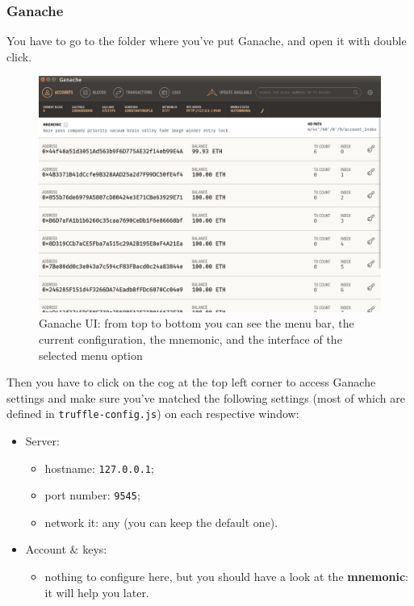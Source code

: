 \subsubsection{Ganache}
You have to go to the folder where you've put Ganache, and open it with double click.
\begin{figure}
	\centering
	\caption{Ganache UI: from top to bottom you can see the menu bar, the current configuration, the mnemonic, and the interface of the selected menu option}
	\includegraphics[scale=0.25]{res/images/ganache-ui.png}
\end{figure}
Then you have to click on the cog at the top left corner to access Ganache settings and make sure you've matched the following settings (most of which are defined in \texttt{truffle-config.js}) on each respective window:
\begin{itemize}
	\item Server:
	\begin{itemize}
		\item hostname: \texttt{127.0.0.1};
		\item port number: \texttt{9545};
		\item network it: any (you can keep the default one).
	\end{itemize}
	\item Account \& keys:
	\begin{itemize}
		\item nothing to configure here, but you should have a look at the \textbf{mnemonic}: it will help you later.
	\end{itemize}
\end{itemize}


